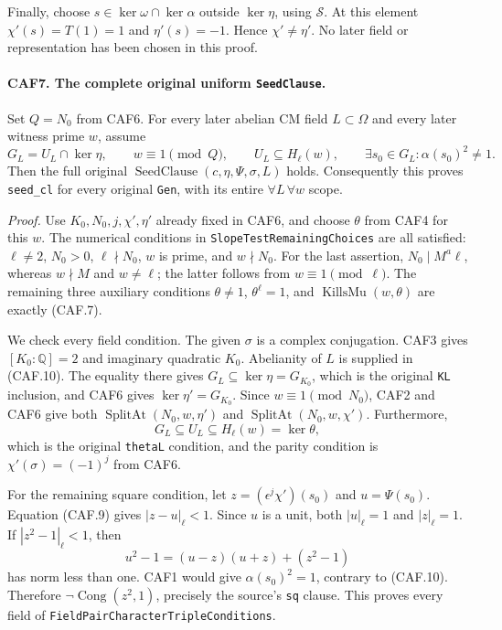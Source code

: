 Finally, choose \(s\in\ker\omega\cap\ker\alpha\) outside
\(\ker\eta\), using \(\mathcal S\).  At this element
\(\chi'(s)=T(1)=1\) and \(\eta'(s)=-1\).  Hence
\(\chi'\ne\eta'\).  No later field or representation has been
chosen in this proof.

\paragraph{CAF7. The complete original uniform \texttt{SeedClause}.}
\label{claim:CAF7}
Set \(Q=N_0\) from CAF6.  For every later abelian CM field
\(L\subset\Omega\) and every later witness prime \(w\), assume
\[
 G_L=U_L\cap\ker\eta,\qquad w\equiv1\pmod Q,
 \qquad U_L\subseteq H_\ell(w),\qquad
 \exists s_0\in G_L:\alpha(s_0)^2\ne1.
 \tag{CAF.10}
\]
Then the full original
\(\operatorname{SeedClause}(c,\eta,\Psi,\sigma,L)\) holds.
Consequently this proves \texttt{seed\_cl} for every original
\texttt{Gen}, with its entire \(\forall L\,\forall w\) scope.

\emph{Proof.}
Use \(K_0,N_0,j,\chi',\eta'\) already fixed in CAF6, and choose
\(\theta\) from CAF4 for this \(w\).  The numerical conditions in
\texttt{SlopeTestRemainingChoices} are all satisfied: \(\ell\ne2\),
\(N_0>0\), \(\ell\nmid N_0\), \(w\) is prime, and
\(w\nmid N_0\).  For the last assertion, \(N_0\mid M^a\ell\),
whereas \(w\nmid M\) and \(w\ne\ell\); the latter follows from
\(w\equiv1\pmod\ell\).  The remaining three auxiliary conditions
\(\theta\ne1\), \(\theta^\ell=1\), and
\(\operatorname{KillsMu}(w,\theta)\) are exactly (CAF.7).

We check every field condition.  The given \(\sigma\) is a complex
conjugation.  CAF3 gives \([K_0:\mathbb Q]=2\) and imaginary
quadratic \(K_0\).  Abelianity of \(L\) is supplied in (CAF.10).
The equality there gives
\(G_L\subseteq\ker\eta=G_{K_0}\), which is the original
\texttt{KL} inclusion, and CAF6 gives
\(\ker\eta'=G_{K_0}\).  Since \(w\equiv1\pmod {N_0}\),
CAF2 and CAF6 give both
\(\operatorname{SplitAt}(N_0,w,\eta')\) and
\(\operatorname{SplitAt}(N_0,w,\chi')\).  Furthermore,
\[
        G_L\subseteq U_L\subseteq H_\ell(w)=\ker\theta,
\]
which is the original \texttt{thetaL} condition, and the parity
condition is \(\chi'(\sigma)=(-1)^j\) from CAF6.

For the remaining square condition, let
\(z=(\epsilon^j\chi')(s_0)\) and \(u=\Psi(s_0)\).
Equation (CAF.9) gives \(|z-u|_\ell<1\).  Since \(u\) is a
unit, both \(|u|_\ell=1\) and \(|z|_\ell=1\).
If \(|z^2-1|_\ell<1\), then
\[
 u^2-1=(u-z)(u+z)+(z^2-1)
\]
has norm less than one.  CAF1 would give
\(\alpha(s_0)^2=1\), contrary to (CAF.10).  Therefore
\(\neg\operatorname{Cong}(z^2,1)\), precisely the source's
\texttt{sq} clause.  This proves every field of
\texttt{FieldPair\allowbreak{}Character\allowbreak{}TripleConditions}.

